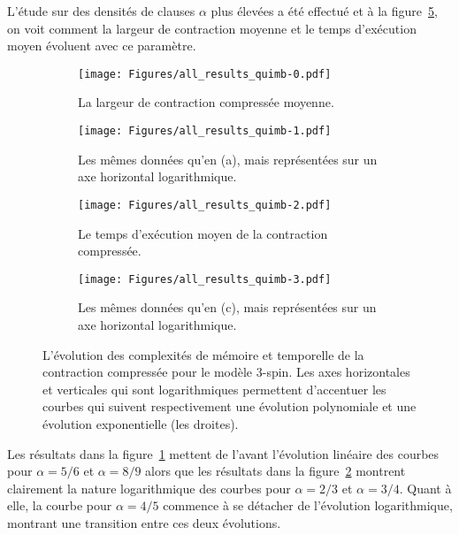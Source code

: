 L'étude sur des densités de clauses $\alpha$ plus élevées a été effectué et à la figure~\ref{fig:all-results-quimb}, on voit comment la largeur de contraction moyenne et le temps d'exécution moyen évoluent avec ce paramètre.
\begin{figure}[h!]
    \centering
    \begin{subfigure}{.49\textwidth}
        \centering
        \texttt{[image: Figures/all\_results\_quimb-0.pdf]}
        \caption{La largeur de contraction compressée moyenne.}
        \label{subfig:all-results-quimb-a}
    \end{subfigure}
    \hfill
    \begin{subfigure}{.49\textwidth}
        \centering
        \texttt{[image: Figures/all\_results\_quimb-1.pdf]}
        \caption{Les mêmes données qu'en (a), mais représentées sur un axe horizontal logarithmique.}
        \label{subfig:all-results-quimb-b}
    \end{subfigure}

    \medskip

    \begin{subfigure}{.49\textwidth}
        \centering
        \texttt{[image: Figures/all\_results\_quimb-2.pdf]}
        \caption{Le temps d'exécution moyen de la contraction compressée.}
        \label{subfig:all-results-quimb-c}
    \end{subfigure}
    \hfill
    \begin{subfigure}{.49\textwidth}
        \centering
        \texttt{[image: Figures/all\_results\_quimb-3.pdf]}
        \caption{Les mêmes données qu'en (c), mais représentées sur un axe horizontal logarithmique.}
        \label{subfig:all-results-quimb-d}
    \end{subfigure}
    \caption{L'évolution des complexités de mémoire et temporelle de la contraction compressée pour le modèle $3$-spin.  Les axes horizontales et verticales qui sont logarithmiques permettent d'accentuer les courbes qui suivent respectivement une évolution polynomiale et une évolution exponentielle (les droites).}
    \label{fig:all-results-quimb}
\end{figure}
Les résultats dans la figure~\ref{subfig:all-results-quimb-a} mettent de l'avant l'évolution linéaire des courbes pour $\alpha = 5/6$ et $\alpha = 8/9$ alors que les résultats dans la figure~\ref{subfig:all-results-quimb-b} montrent clairement la nature logarithmique des courbes pour $\alpha = 2/3$ et $\alpha = 3/4$.
Quant à elle, la courbe pour $\alpha = 4/5$ commence à se détacher de l'évolution logarithmique, montrant une transition entre ces deux évolutions.


